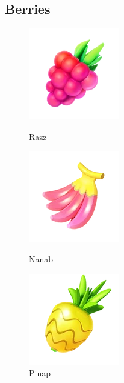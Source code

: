 \subsection{Berries}
\begin{figure}[h!]
  \begin{minipage}[t]{0.3\textwidth}
    \begin{center}
    \includegraphics[scale=.4]{images/razz.png}
    \end{center}
    \caption[Razz berry]{Razz}
    \label{fig:razz}
  \end{minipage}
  \begin{minipage}[t]{0.3\textwidth}
    \begin{center}
    \includegraphics[scale=.4]{images/nanab.png}
    \end{center}
    \caption[Nanab berry]{Nanab}
    \label{fig:nanab}
  \end{minipage}
  \begin{minipage}[t]{0.3\textwidth}
    \begin{center}
    \includegraphics[scale=.4]{images/pinap.png}
    \end{center}
    \caption[Pinap berry]{Pinap}
    \label{fig:pinap}
  \end{minipage}
\end{figure}
